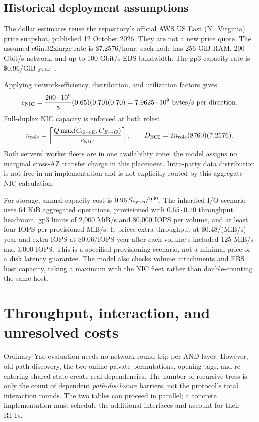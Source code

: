 \documentclass[11pt]{article}
\newcommand{\ceil}[1]{\left\lceil #1\right\rceil}
\begin{document}
\subsection{Historical deployment assumptions}
The dollar estimates reuse the repository's official AWS US East
(N.~Virginia) price snapshot, published 12 October 2026. They are not a new
price quote. The assumed c6in.32xlarge rate is \$7.2576/hour; each node has
256 GiB RAM, 200 Gbit/s network, and up to 100 Gbit/s EBS bandwidth.
The gp3 capacity rate is \$0.96/GiB-year~\cite{awsnetwork,awsebs,awsprice}.

Applying network-efficiency, distribution, and utilization factors gives
\begin{equation}
 c_{\rm NIC}=\frac{200\cdot10^9}{8}(0.65)(0.70)(0.70)
            =7.9625\cdot10^9\ \text{bytes/s per direction}.
\end{equation}
Full-duplex NIC capacity is enforced at both roles:
\begin{equation}
 n_{\rm role}=\ceil{\frac{Q\max(C_{G\to E},C_{E\to G})}{c_{\rm NIC}}},
 \qquad D_{\rm EC2}=2n_{\rm role}(8760)(7.2576).
\end{equation}
Both servers' worker fleets are in one availability zone; the model assigns
no marginal cross-AZ transfer charge in this placement. Intra-party data
distribution is not free in an implementation and is not explicitly routed
by this aggregate NIC calculation.

For storage, annual capacity cost is
$0.96\,S_{\rm bytes}/2^{30}$. The inherited I/O scenario uses 64 KiB aggregated
operations, provisioned with $0.65\cdot0.70$ throughput headroom, gp3 limits
of 2,000 MiB/s and 80,000 IOPS per volume, and at least four IOPS per provisioned
MiB/s. It prices extra throughput at \$0.48/(MiB/s)-year and extra IOPS at
\$0.06/IOPS-year after each volume's included 125 MiB/s and 3,000 IOPS.
This is a specified provisioning scenario, not a minimal price or a disk
latency guarantee. The model also checks volume attachments and EBS host
capacity, taking a maximum with the NIC fleet rather than double-counting
the same host.



\section{Throughput, interaction, and unresolved costs}
\label{sec:limits}
Ordinary Yao evaluation needs no network round trip per AND layer. However,
old-path discovery, the two online private permutations, opening tags, and
re-entering shared state create real dependencies. The number of recursive
trees is only the count of dependent \emph{path-disclosure} barriers, not
the protocol's total interaction rounds. The two tables can proceed in
parallel; a concrete implementation must schedule the additional interfaces
and account for their RTTs.
\end{document}
